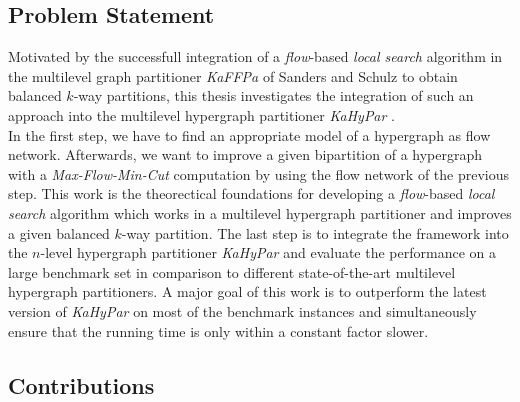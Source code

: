 \subsection{Problem Statement}

Motivated by the successfull integration of a \emph{flow}-based \emph{local search} algorithm in the multilevel graph 
partitioner \emph{KaFFPa} of Sanders and Schulz \cite{sanders2011engineering} to obtain balanced $k$-way
partitions, this thesis investigates the integration of such an approach into the multilevel hypergraph
partitioner \emph{KaHyPar} \cite{heuer2017improving}.\\
In the first step, we have to find an appropriate model of a hypergraph as flow network. Afterwards, 
we want to improve a given bipartition of a hypergraph with a \emph{Max-Flow-Min-Cut} 
computation by using the flow network of the previous step.
This work is the theorectical foundations for developing a \emph{flow}-based \emph{local search} 
algorithm which works in a multilevel hypergraph partitioner and improves a given
balanced $k$-way partition. The last step is to integrate the framework into the
$n$-level hypergraph partitioner \emph{KaHyPar} \cite{heuer2017improving} and evaluate
the performance on a large benchmark set in comparison to different state-of-the-art 
multilevel hypergraph partitioners. A major goal of this work is to outperform the 
latest version of \emph{KaHyPar} on most of the benchmark instances and simultaneously
ensure that the running time is only within a constant factor slower.

\subsection{Contributions}

